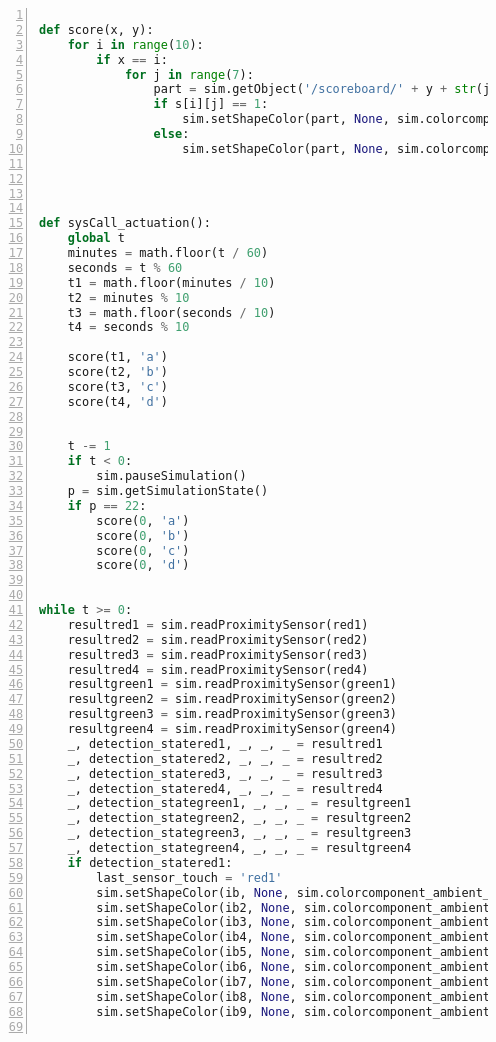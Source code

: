 \begin{lstlisting}[language=Python, frame=single, numbers=left, captionpos=b, basicstyle=\ttfamily\small, showstringspaces=false, breaklines=true, tabsize=4, xleftmargin=15pt]
 
def score(x, y):
    for i in range(10):
        if x == i:
            for j in range(7):
                part = sim.getObject('/scoreboard/' + y + str(j))
                if s[i][j] == 1:
                    sim.setShapeColor(part, None, sim.colorcomponent_ambient_diffuse, [1, 1, 1])
                else:
                    sim.setShapeColor(part, None, sim.colorcomponent_ambient_diffuse, [0, 0, 0])
 
 
 
 
def sysCall_actuation():
    global t
    minutes = math.floor(t / 60)
    seconds = t % 60
    t1 = math.floor(minutes / 10)
    t2 = minutes % 10
    t3 = math.floor(seconds / 10)
    t4 = seconds % 10
     
    score(t1, 'a')
    score(t2, 'b')
    score(t3, 'c')
    score(t4, 'd')
 
     
    t -= 1
    if t < 0:
        sim.pauseSimulation()
    p = sim.getSimulationState()
    if p == 22:
        score(0, 'a')
        score(0, 'b')
        score(0, 'c')
        score(0, 'd')
 
 
while t >= 0:
    resultred1 = sim.readProximitySensor(red1)
    resultred2 = sim.readProximitySensor(red2)
    resultred3 = sim.readProximitySensor(red3)
    resultred4 = sim.readProximitySensor(red4)
    resultgreen1 = sim.readProximitySensor(green1)
    resultgreen2 = sim.readProximitySensor(green2)
    resultgreen3 = sim.readProximitySensor(green3)
    resultgreen4 = sim.readProximitySensor(green4)
    _, detection_statered1, _, _, _ = resultred1
    _, detection_statered2, _, _, _ = resultred2
    _, detection_statered3, _, _, _ = resultred3
    _, detection_statered4, _, _, _ = resultred4
    _, detection_stategreen1, _, _, _ = resultgreen1
    _, detection_stategreen2, _, _, _ = resultgreen2
    _, detection_stategreen3, _, _, _ = resultgreen3
    _, detection_stategreen4, _, _, _ = resultgreen4
    if detection_statered1:
        last_sensor_touch = 'red1'
        sim.setShapeColor(ib, None, sim.colorcomponent_ambient_diffuse, [1, 0, 0])
        sim.setShapeColor(ib2, None, sim.colorcomponent_ambient_diffuse, [1, 0, 0])
        sim.setShapeColor(ib3, None, sim.colorcomponent_ambient_diffuse, [1, 1, 1])
        sim.setShapeColor(ib4, None, sim.colorcomponent_ambient_diffuse, [1, 1, 1])
        sim.setShapeColor(ib5, None, sim.colorcomponent_ambient_diffuse, [0, 0, 0])
        sim.setShapeColor(ib6, None, sim.colorcomponent_ambient_diffuse, [1, 1, 1])
        sim.setShapeColor(ib7, None, sim.colorcomponent_ambient_diffuse, [1, 1, 1])
        sim.setShapeColor(ib8, None, sim.colorcomponent_ambient_diffuse, [0, 0, 0])
        sim.setShapeColor(ib9, None, sim.colorcomponent_ambient_diffuse, [1, 1, 1])
 

\end{lstlisting}
